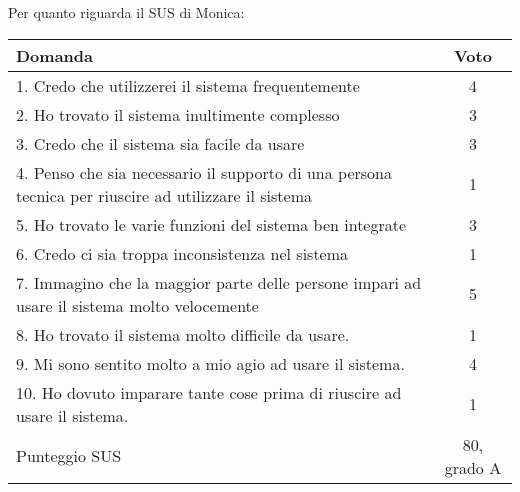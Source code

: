 \documentclass[../Report.tex]{subfiles}
\begin{document}
    Per quanto riguarda il SUS di Monica:
    \begin{table}[H]
        \begin{tabular}{|p{10cm}|c|}
            \hline
            \textbf{Domanda} & \textbf{Voto}\\
            \hline
            1. Credo che utilizzerei il sistema frequentemente & 4 \\
            \hline
            2. Ho trovato il sistema inultimente complesso & 3  \\
            \hline
            3. Credo che il sistema sia facile da usare & 3 \\
            \hline
            4. Penso che sia necessario il supporto di una persona tecnica per riuscire ad utilizzare il sistema & 1 \\
            \hline
            5. Ho trovato le varie funzioni del sistema ben integrate & 3 \\
            \hline
            6. Credo ci sia troppa inconsistenza nel sistema & 1 \\
            \hline
            7. Immagino che la maggior parte delle persone impari ad usare il sistema molto velocemente & 5 \\
            \hline
            8. Ho trovato il sistema molto difficile da usare. & 1 \\
            \hline
            9. Mi sono sentito molto a mio agio ad usare il sistema. & 4 \\
            \hline
            10. Ho dovuto imparare tante cose prima di riuscire ad usare il sistema. & 1 \\ 
            \hline
            Punteggio SUS & 80, grado A \\
            \hline
        \end{tabular}
    \end{table}
\end{document}
